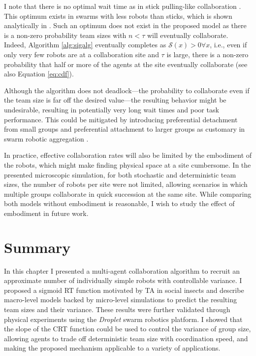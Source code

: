 \documentclass[12pt]{book}
\newcommand{\Sig}{\mathcal{S}}  %
\begin{document}
I note that there is no optimal wait time as in stick pulling-like collaboration \cite{Lerman2001}. This optimum exists in swarms with less robots than sticks, which is shown analytically in \cite{Martinoli2004}. Such an optimum does not exist in the proposed model as there is a non-zero probability team sizes with $n<\tau$ will eventually collaborate. Indeed, Algorithm \ref{alg:sigalg} eventually completes as $\Sig(x) > 0 \forall x$, i.e., even if only very few robots are at a collaboration site and $\tau$ is large, there is a non-zero probability that half or more of the agents at the site eventually collaborate (see also Equation \ref{eq:cdf}).

Although the algorithm does not deadlock---the probability to collaborate even if the team size is far off the desired value---the resulting behavior might be undesirable, resulting in potentially very long wait times and poor task performance. This could be mitigated by introducing preferential detachment from small groups and preferential attachment to larger groups as customary in swarm robotic aggregation \cite{Correll2011}.

In practice, effective collaboration rates will also be limited by the embodiment of the robots, which might make finding physical space at a site cumbersome. In the presented microscopic simulation, for both stochastic and deterministic team sizes, the number of robots per site were not limited, allowing scenarios in which multiple groups collaborate in quick succession at the same site. While comparing both models without embodiment is reasonable, I wish to study the effect of embodiment in future work.

\newpage
\section{Summary}
In this chapter I presented a multi-agent collaboration algorithm to recruit an approximate number of individually simple robots with controllable variance. I proposed a sigmoid RT function motivated by TA in social insects and describe macro-level models backed by micro-level simulations to predict the resulting team sizes and their variance.  These results were further validated through physical experiments using the \emph{Droplet} swarm robotics platform. I showed that the slope of the CRT function could be used to control the variance of group size, allowing agents to trade off deterministic team size with coordination speed, and making the proposed mechanism applicable to a variety of applications.
\end{document}
